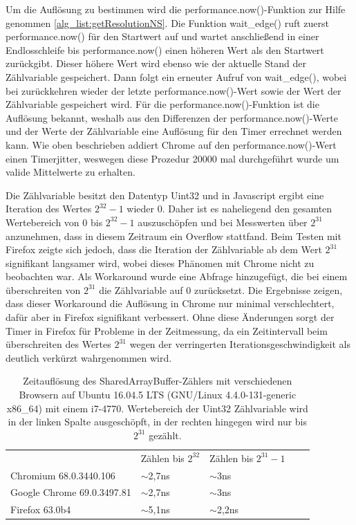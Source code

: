 Um die Auflösung zu bestimmen wird die performance.now()-Funktion zur Hilfe genommen \ref{alg_list:getResolutionNS}. Die Funktion wait_edge() ruft zuerst performance.now() für den Startwert auf und wartet anschließend in einer Endlosschleife bis performance.now() einen höheren Wert als den Startwert zurückgibt. 
Dieser höhere Wert wird ebenso wie der aktuelle Stand der Zählvariable gespeichert. 
Dann folgt ein erneuter Aufruf von wait_edge(), wobei bei zurückkehren wieder der letzte performance.now()-Wert sowie der Wert der Zählvariable gespeichert wird.
Für die performance.now()-Funktion ist die Auflösung bekannt, weshalb aus den Differenzen der performance.now()-Werte und der Werte der Zählvariable eine Auflösung für den Timer errechnet werden kann.
Wie oben beschrieben addiert Chrome auf den performance.now()-Wert einen Timerjitter, weswegen diese Prozedur 20000 mal durchgeführt wurde um valide Mittelwerte zu erhalten.

Die Zählvariable besitzt den Datentyp Uint32 und in Javascript ergibt eine Iteration des Wertes $2^{32}-1$ wieder 0. 
Daher ist es naheliegend den gesamten Wertebereich von 0 bis $2^{32}-1$ auszuschöpfen und bei Messwerten über $2^{31}$ anzunehmen, dass in diesem Zeitraum ein Overflow stattfand.
Beim Testen mit Firefox zeigte sich jedoch, dass die Iteration der Zählvariable ab dem Wert $2^{31}$ signifikant langsamer wird, wobei dieses Phänomen mit Chrome nicht zu beobachten war.
Als Workaround wurde eine Abfrage hinzugefügt, die bei einem überschreiten von $2^{31}$ die Zählvariable auf 0 zurücksetzt.
Die Ergebnisse zeigen, dass dieser Workaround die Auflösung in Chrome nur minimal verschlechtert, dafür aber in Firefox signifikant verbessert.
Ohne diese Änderungen sorgt der Timer in Firefox für Probleme in der Zeitmessung, da ein Zeitintervall beim überschreiten des Wertes $2^{31}$ wegen der verringerten Iterationsgeschwindigkeit als deutlich verkürzt wahrgenommen wird.

\label{tbl:times_res}
\begin{table}[h]
\caption{Zeitauflösung des SharedArrayBuffer-Zählers mit verschiedenen Browsern auf Ubuntu 16.04.5 LTS (GNU/Linux 4.4.0-131-generic x86_64) mit einem i7-4770. Wertebereich der Uint32 Zählvariable wird in der linken Spalte ausgeschöpft, in der rechten hingegen wird nur bis $2^{31}$ gezählt.}
\begin{tabular}{lllll}
                           & Zählen bis $2^{32}$ & Zählen bis $2^{31}-1$ &  &  \\
Chromium 68.0.3440.106     & $\sim$2,7ns                      & $\sim$3ns                        &  &  \\
Google Chrome 69.0.3497.81 & $\sim$2,7ns                      & $\sim$3ns                        &  &  \\
Firefox 63.0b4             & $\sim$5,1ns                      & $\sim$2,2ns                      &  & 
\end{tabular}
\end{table}


